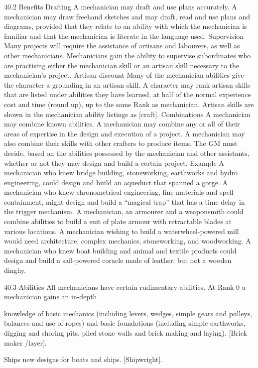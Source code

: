 \documentclass[a4paper]{article}
\begin{document}
\begin{multicols}{3}
40.2 Benefits
Drafting A mechanician may draft and use plans
accurately. A mechanician may draw freehand
sketches and may draft, read and use plans and
diagrams, provided that they relate to an ability
with which the mechanician is familiar and that the
mechanician is literate in the language used.
Supervision Many projects will require the assistance of artisans and labourers, as well as other
mechanicians. Mechanicians gain the ability to
supervise subordinates who are practising either
the mechanician skill or an artisan skill necessary
to the mechanician’s project.
Artisan discount Many of the mechanician abilities give the character a grounding in an artisan
skill. A character may rank artisan skills that are
listed under abilities they have learned, at half of
the normal experience cost and time (round up), up
to the same Rank as mechanician. Artisan skills are
shown in the mechanician ability listings as [craft].
Combinations A mechanician may combine
known abilities. A mechanician may combine any
or all of their areas of expertise in the design and
execution of a project. A mechanician may also
combine their skills with other crafters to produce
items. The GM must decide, based on the abilities
possessed by the mechanician and other assistants,
whether or not they may design and build a certain
project.
Example
A mechanician who knew bridge building,
stoneworking, earthworks and hydro engineering, could
design and build an aqueduct that spanned a gorge. A
mechanician who knew chronometrical engineering, fine
materials and spell containment, might design and build a
“magical trap” that has a time delay in the trigger mechanism. A mechanician, an armourer and a weaponsmith
could combine abilities to build a suit of plate armour with
retractable blades at various locations. A mechanician
wishing to build a waterwheel-powered mill would need
architecture, complex mechanics, stoneworking, and
woodworking. A mechanician who knew boat building
and animal and textile products could design and build a
sail-powered coracle made of leather, but not a wooden
dinghy.

40.3 Abilities
All mechanicians have certain rudimentary abilities. At Rank 0 a mechanician gains an in-depth

knowledge of basic mechanics (including levers,
wedges, simple gears and pulleys, balances and use
of ropes) and basic foundations (including simple
earthworks, digging and shoring pits, piled stone
walls and brick making and laying). [Brick maker
/layer].

Ships new designs for boats and ships. [Shipwright].


\end{multicols}
\end{document}
